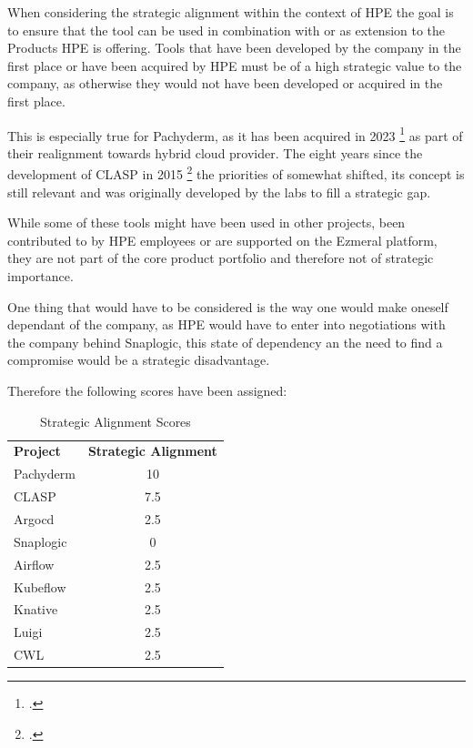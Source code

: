 
When considering the strategic alignment within the context of \ac{HPE} the goal is to ensure that the tool can be used in combination with or as extension to the Products \ac{HPE} is offering.
Tools that have been developed by the company in the first place or have been acquired by \ac{HPE} must be of a high strategic value to the company, as otherwise they would not have been developed or acquired in the first place.

This is especially true for Pachyderm, as it has been acquired in 2023 \footcite{HewlettPackardEnterprise} as part of their realignment towards hybrid cloud provider.
The eight years since the development of \ac{CLASP} in 2015 \footcite{sayersCLoudApplicationServices2015} the priorities of somewhat shifted, its concept is still relevant and was originally developed by the labs to fill a strategic gap.

While some of these tools might have been used in other projects, been contributed to by \ac{HPE} employees or are supported on the Ezmeral platform, they are not part 
of the core product portfolio and therefore not of strategic importance.

One thing that would have to be considered is the way one would make oneself dependant of the company, as \ac{HPE} would have to enter into negotiations with the company behind Snaplogic, 
this state of dependency an the need to find a compromise would be a strategic disadvantage.

Therefore the following scores have been assigned:

\begin{table}[htb]
  \centering
  \caption{Strategic Alignment Scores}
  \begin{tabular}{|l|c|} 
    \textbf{Project} & \textbf{Strategic Alignment} \\
    Pachyderm  & 10   \\
    \ac{CLASP}       & 7.5  \\
    Argocd       & 2.5  \\
    Snaplogic      & 0          \\
    Airflow      & 2.5          \\
    Kubeflow      & 2.5          \\
    Knative      & 2.5          \\
    Luigi      & 2.5          \\
    CWL      & 2.5          \\
  \end{tabular}
\end{table}

